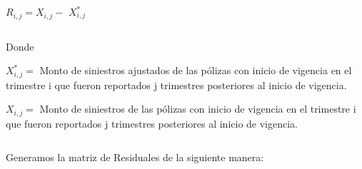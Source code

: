 \documentclass[11pt,twoside,openright,spanish]{report}
\numberwithin{equation}{chapter}
\numberwithin{figure}{chapter}
\numberwithin{table}{chapter}
\begin{document}
	\doublespacing

$ $

\doublespacing
	
		{\centering
	 $R_{i,j}^{}= X_{i,j}^{} -$  $X_{i,j}^{*} $ 
		\noindent
	
}	


	\doublespacing

$ $

\doublespacing
	
	Donde
	
	\doublespacing
	
 ${X}_{i,j}^{*}=$ Monto de siniestros ajustados de las pólizas con inicio de vigencia en el trimestre i que fueron reportados j trimestres posteriores al inicio de vigencia.	

 ${X}_{i,j}=$ Monto de siniestros de las pólizas con inicio de vigencia en el trimestre i que fueron reportados j trimestres posteriores al inicio de vigencia.	
	
	\doublespacing

$ $

Generamos la matriz de Residuales de la siguiente manera:

	\doublespacing

$ $

\doublespacing
	
\end{document}
